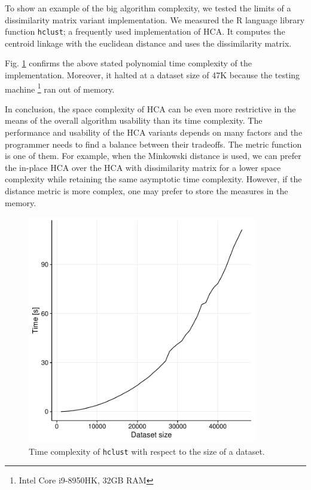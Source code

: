 To show an example of the big algorithm complexity, we tested the limits of a dissimilarity matrix variant implementation. We measured the R language library function \texttt{hclust}; a frequently used implementation of HCA. It computes the centroid linkage with the euclidean distance and uses the dissimilarity matrix. 

Fig. \ref{fig01:hclust} confirms the above stated polynomial time complexity of the implementation. Moreover, it halted at a dataset size of 47K because the testing machine \footnote{Intel Core i9-8950HK, 32GB RAM} ran out of memory.

In conclusion, the space complexity of HCA can be even more restrictive in the means of the overall algorithm usability than its time complexity. The performance and usability of the HCA variants depends on many factors and the programmer needs to find a balance between their tradeoffs. The metric function is one of them. For example, when the Minkowski distance is used, we can prefer the in-place HCA over the HCA with dissimilarity matrix for a lower space complexity while retaining the same asymptotic time complexity. However, if the distance metric is more complex, one may prefer to store the measures in the memory.

\begin{figure}\centering
	\includegraphics[width=10cm]{img/hclust}
	\caption{Time complexity of \texttt{hclust} with respect to the size of a dataset.}
	\label{fig01:hclust}
\end{figure}
